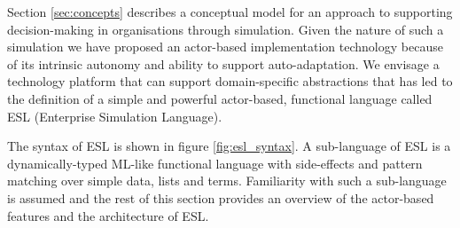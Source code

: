 \documentclass[10pt,numbers]{sigplanconf}
\begin{document}
Section \ref{sec:concepts} describes a conceptual model for an approach to supporting decision-making in organisations through simulation. Given the nature of such a simulation we have proposed an actor-based implementation technology because of its intrinsic autonomy and ability to support auto-adaptation. We envisage a technology platform that can support domain-specific abstractions that has led to the definition of a simple and powerful actor-based, functional language called ESL (Enterprise Simulation Language).

The syntax of ESL is shown in figure \ref{fig:esl_syntax}. A sub-language of ESL is a  dynamically-typed ML-like functional language with side-effects and pattern matching over simple data, lists and terms. Familiarity with such a sub-language is assumed and the rest of this section provides an overview of the actor-based features and the architecture of ESL.
\end{document}
